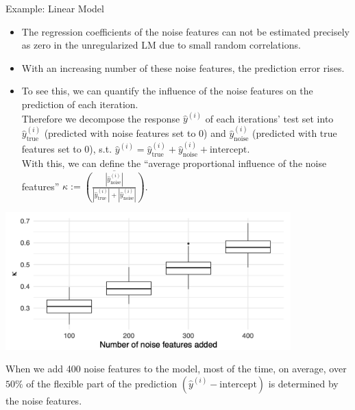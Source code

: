 \begin{vbframe}{Example: Linear Model}
\framebreak
\begin{itemize}
\item The regression coefficients of the noise features can not be estimated precisely as zero in the unregularized LM due to small random correlations. 
\item With an increasing number of these noise features, the prediction error rises.
\item To see this, we can quantify the influence of the noise features on the prediction of each iteration. \\ 
Therefore we decompose the response $\hat y^{(i)}$ of each iterations' test set into $\hat y^{(i)}_{\text{true}}$ (predicted with noise features set to 0) and $\hat y^{(i)}_{\text{noise}}$ (predicted with true features set to 0), s.t. $\hat y^{(i)} =  \hat y^{(i)}_{\text{true}} + \hat y^{(i)}_{\text{noise}} + \text{intercept}$. \\
With this, we can define the \enquote{average proportional influence of the noise features} $\kappa := \overline{\left( \frac{|\hat y^{(i)}_{\text{noise}}|}{|\hat y^{(i)}_{\text{true}}| + |\hat y^{(i)}_{\text{noise}}|} \right)}$.

\end{itemize}
\framebreak

\begin{center}
\includegraphics[width = 11cm ]{figure_man/added_noise.png}
\end{center}

When we add 400 noise features to the model, most of the time, on average, over $50\%$ of the flexible part of the prediction $(\hat y^{(i)} - \text{intercept})$ is determined by the noise features.

\end{vbframe} 

